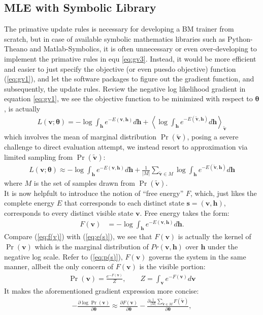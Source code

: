 \documentclass[11pt]{article}
\newcommand{\mean}[2]{\left\langle{#1}\right\rangle_{#2}}
\newcommand{\vh}{\boldsymbol{h}}
\newcommand{\vv}{\boldsymbol{v}}
\newcommand{\vs}{\boldsymbol{s}}
\newcommand{\vvt}{\tilde{\vv}}
\newcommand{\pEC}{\boldsymbol{\theta}}
\newcommand{\PDV}[2]{\frac{\partial #1}{\partial #2}}
\begin{document}
{\subsection{MLE with Symbolic Library}
The primative update rules is necessary for developing a BM trainer from scratch, but in case of available symbolic mathematics libraries such as Python-Theano and Matlab-Symbolics, it is often unnecessary or even over-developing to implement the primative rules in equ \ref{eq:gv3}. Instead, it would be more efficient and easier to just specify the objective (or even puesdo objective) function (\ref{eq:gv1}), and let the software packages to figure out the gradient function, and subsequently, the update rules.
Review the negative log likelihood gradient in equation \ref{eq:gv1}, we see the objective function to be minimized with respect to $\pEC$, is actually
\begin{align}\label{eq:l(v)1}
  L(\vv; \pEC) = -\log{\int_{\vh}{e^{-E(\vv, \vh)}d\vh}} + \mean{\log{\int_{\vh}{e^{-E(\vvt, \vh)}d\vh}}}{\vvt}
\end{align}
which involves the mean of marginal distribution $\Pr(\vvt)$, posing a severe challenge to direct evaluation attempt, we instead resort to approximation via limited sampling from $\Pr(\vvt)$:
\begin{align}\label{eq:l(v)2}
  L(\vv; \pEC) \approx -\log{\int_{\vh} e^{-E(\vv, \vh)} d\vh} + \frac{1}{|M|}\sum_{\vvt \in M}{\log{\int_{\vh} e^{-E(\vvt, \vh)}d\vh}}
\end{align}
where $M$ is the set of samples drawn from $\Pr(\vvt)$. \\
It is now helpfult to introduce the notion of ``free energy'' $F$, which, just likes the complete energy $E$ that corresponds to each distinct state $\vs=(\vv, \vh)$, corresponds to every distinct visible state $\vv$. Free energy takes the form:
\begin{equation}\label{eq:f(v)}
  \begin{split}
    F(\vv) &= -\log{\int_{\vh}{e^{-E(\vv, \vh)}d\vh}}.
  \end{split}
\end{equation}
Compare (\ref{eq:f(v)}) with (\ref{eq:e(s)}), we see that $F(\vv)$ is actually the kernel of $\Pr(\vv)$ which is the marginal distribution of $Pr(\vv, \vh)$ over $\vh$ under the negative log scale. Refer to (\ref{eq:p(s)}), $F(\vv)$ governs the system in the same manner, allbeit the only concern of $F(\vv)$ is the visible portion:
\begin{align}\label{eq:p(v)|fe}
    \Pr(\vv) = \frac{e^{-F(\vv)}}{Z}, \quad\quad Z=\int_{\vv}{e^{-F(\vv)}}d\vv
\end{align}
It makes the aforementioned gradient expression more concise:
\begin{align}\label{eq:grad3}
  -\PDV{\log{\Pr(\vv)}}{\pEC} \approx \PDV{F(\vv)}{\pEC} - \PDV{\frac{1}{|M|}\sum_{\vvt \in M}{F(\vvt)}}{\pEC},
\end{align}
}
\end{document}
